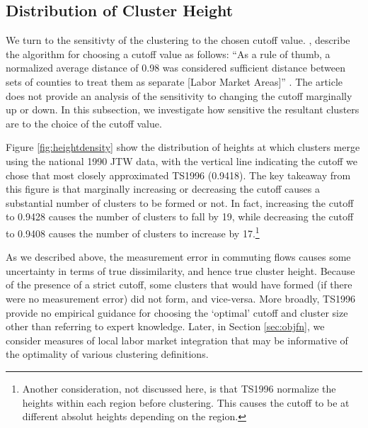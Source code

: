 \subsection{Distribution of Cluster Height \label{sec:clusterheight}}

We turn to the sensitivty of the clustering to the chosen cutoff value. \citet{TK1987}, describe the algorithm for choosing a cutoff value as follows: ``As a rule of thumb, a normalized average distance of 0.98 was considered sufficient distance between sets of counties to treat them as separate [Labor Market Areas]'' \citep[page 15]{TK1987}.  The article does not provide an analysis of the sensitivity to changing the cutoff marginally up or down. In this subsection, we investigate how sensitive the resultant clusters are to the choice of the cutoff value.




Figure \ref{fig:heightdensity}  show the distribution of heights at which clusters merge using the national 1990 JTW data, with the vertical line indicating the cutoff we chose that most closely approximated TS1996 (0.9418). The key takeaway from this figure is that marginally increasing or decreasing the cutoff causes a substantial number of clusters to be formed or not. In fact, increasing the cutoff to 0.9428 causes the number of clusters to fall by 19, while decreasing the cutoff to 0.9408 causes the number of clusters to increase by 17.\footnote{Another consideration, not discussed here, is that TS1996 normalize the heights within each region before clustering. This causes the cutoff to be at different absolut heights depending on the region.}

As we described above, the measurement error in commuting flows causes some uncertainty in terms of true dissimilarity, and hence true cluster height. Because of the presence of a strict cutoff, some clusters that would have formed (if there were no measurement error) did not form, and vice-versa. More broadly, TS1996 provide no empirical guidance for choosing the `optimal' cutoff and cluster size other than referring to expert knowledge. Later, in Section \ref{sec:objfn}, we consider measures of local labor market integration that may be informative of the optimality of various clustering definitions. 



